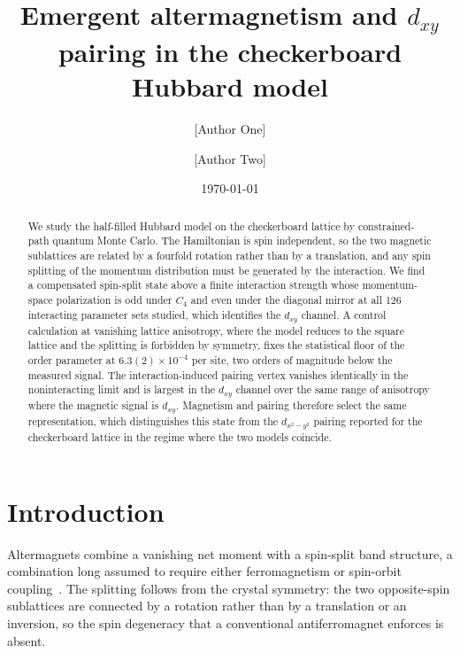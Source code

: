 \documentclass[aps,prl,reprint,superscriptaddress,amsmath,amssymb,floatfix]{revtex4-2}
\begin{document}
\title{Emergent altermagnetism and $d_{xy}$ pairing in the checkerboard Hubbard model}

\author{[Author One]}
\affiliation{[Affiliation]}
\author{[Author Two]}
\affiliation{[Affiliation]}

\date{\today}

\begin{abstract}
We study the half-filled Hubbard model on the checkerboard lattice by
constrained-path quantum Monte Carlo. The Hamiltonian is spin independent, so
the two magnetic sublattices are related by a fourfold rotation rather than by a
translation, and any spin splitting of the momentum distribution must be
generated by the interaction. We find a compensated spin-split state above a
finite interaction strength whose momentum-space polarization is odd under
$C_4$ and even under the diagonal mirror at all 126 interacting parameter sets
studied, which identifies the $d_{xy}$ channel. A control calculation at
vanishing lattice anisotropy, where the model reduces to the square lattice and
the splitting is forbidden by symmetry, fixes the statistical floor of the order
parameter at $6.3(2)\times10^{-4}$ per site, two orders of magnitude below the
measured signal. The interaction-induced pairing vertex vanishes identically in
the noninteracting limit and is largest in the $d_{xy}$ channel over the same
range of anisotropy where the magnetic signal is $d_{xy}$. Magnetism and pairing
therefore select the same representation, which distinguishes this state from
the $d_{x^2-y^2}$ pairing reported for the checkerboard lattice in the regime
where the two models coincide.
\end{abstract}

\maketitle

\section{Introduction}

Altermagnets combine a vanishing net moment with a spin-split band structure,
a combination long assumed to require either ferromagnetism or spin-orbit
coupling~\cite{Smejkal2022a,Smejkal2022b}. The splitting follows from the
crystal symmetry: the two opposite-spin sublattices are connected by a rotation
rather than by a translation or an inversion, so the spin degeneracy that a
conventional antiferromagnet enforces is absent.
\end{document}
